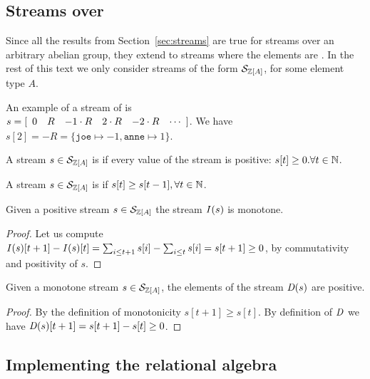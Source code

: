 \subsection{Streams over \zrs}

Since all the results from Section~\ref{sec:streams} are true for streams
over an arbitrary abelian group, they extend to streams where the elements
are \zrs.  In the rest of this text we only consider streams of the form $\mathcal{S}_{\mathbb{Z}[A]}$, for
some element type $A$.

An example of a stream of \zrs is \\ $s = \sv{0 R -1\cdot{R} 2\cdot{R} -2\cdot{R}}$.
We have $s[2] = -R = \{ \texttt{joe} \mapsto -1, \texttt{anne} \mapsto 1 \}$.

\begin{definition}
A stream $s \in \mathcal{S}_{\mathbb{Z}[A]}$ is  if every value of the stream is positive:
$s[t] \geq 0 . \forall t \in \mathbb{N}$.
\end{definition}



\begin{definition}
A stream $s \in \mathcal{S}_{\mathbb{Z}[A]}$ is  if $s[t] \geq s[t-1], \forall t \in \mathbb{N}$.
\end{definition}

\begin{lemma}
Given a positive stream $s \in \mathcal{S}_{\mathbb{Z}[A]}$ the stream $\mathit{I}(s)$ is monotone.
\end{lemma}
\begin{proof}
  Let us compute $\mathit{I}(s)[t + 1] - \mathit{I}(s)[t] = \sum_{i \leq t+1}s[i] -
  \sum_{i \leq t}s[i] = s[t+1] \geq 0$, by commutativity and positivity of $s$.
\end{proof}

\begin{lemma}
Given a monotone stream $s \in \mathcal{S}_{\mathbb{Z}[A]}$, the
elements of the stream $\mathit{D}(s)$ are positive.
\end{lemma}
\begin{proof}
  By the definition of monotonicity $s[t+1] \geq s[t]$.  By definition
  of $\mathit{D}$ we have $\mathit{D}(s)[t+1] = s[t+1] - s[t] \geq 0$.
\end{proof}

\subsection{Implementing the relational algebra}\label{sec:relational-operators}

